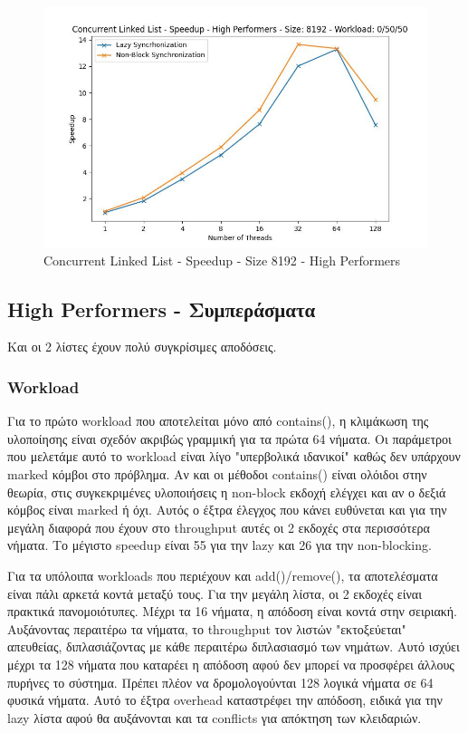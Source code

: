 \documentclass[../final_report.tex]{subfiles}
\begin{document}
\begin{figure}[H]
        \includegraphics[scale=0.4]{outFiles/plots/concurrent_data_structs_high_speedup_8192_0_50_50.jpg}
    \caption{Concurrent Linked List - Speedup - Size 8192 - High Performers}
    \label{fig:Concurrent Linked List - Speedup - Size 8192 - High Performers}
\end{figure}

\subsection*{High Performers - Συμπεράσματα}
Και οι 2 λίστες έχουν πολύ συγκρίσιμες αποδόσεις. 



\subsubsection*{Workload}
Για το πρώτο workload που αποτελείται μόνο από contains(), η κλιμάκωση της υλοποίησης είναι σχεδόν ακριβώς γραμμική
για τα πρώτα 64 νήματα. Οι παράμετροι που μελετάμε αυτό το workload είναι λίγο "υπερβολικά ιδανικοί" καθώς δεν υπάρχουν
marked κόμβοι στο πρόβλημα. Αν και οι μέθοδοι contains() είναι ολόιδοι στην θεωρία, στις συγκεκριμένες υλοποιήσεις η non-block
εκδοχή ελέγχει και αν ο δεξιά κόμβος είναι marked ή όχι. Αυτός ο έξτρα έλεγχος που κάνει ευθύνεται και για την μεγάλη διαφορά που
έχουν στο throughput αυτές οι 2 εκδοχές στα περισσότερα νήματα. Το μέγιστο speedup είναι 55 για την lazy και 26 για την non-blocking.

Για τα υπόλοιπα workloads που περιέχουν και add()/remove(), τα αποτελέσματα είναι πάλι αρκετά κοντά μεταξύ τους. Για την μεγάλη λίστα,
οι 2 εκδοχές είναι πρακτικά πανομοιότυπες. Μέχρι τα 16 νήματα, η απόδοση είναι κοντά στην σειριακή. Αυξάνοντας περαιτέρω τα νήματα, το 
throughput τον λιστών "εκτοξεύεται" απευθείας, διπλασιάζοντας με κάθε περαιτέρω διπλασιασμό των νημάτων. Αυτό ισχύει μέχρι τα 128 νήματα
που καταρέει η απόδοση αφού δεν μπορεί να προσφέρει άλλους πυρήνες το σύστημα. Πρέπει πλέον να δρομολογούνται 128 λογικά νήματα σε 64 φυσικά
νήματα. Αυτό το έξτρα overhead καταστρέφει την απόδοση, ειδικά για την lazy λίστα αφού θα αυξάνονται και τα conflicts για απόκτηση των
κλειδαριών. 
\end{document}
